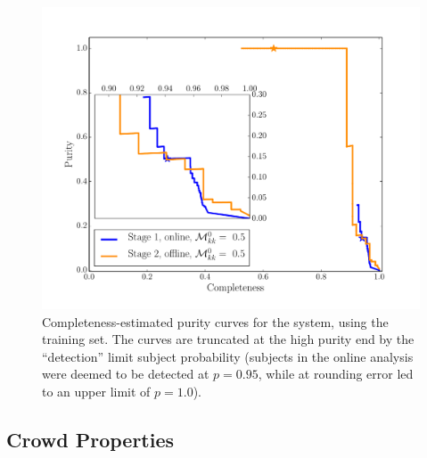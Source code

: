 \documentclass[useAMS,usenatbib,a4paper]{mn2e}
\begin{document}
\begin{figure}
\centering\includegraphics[width=\linewidth]{completeness_purity_simple.pdf}
\caption{Completeness-estimated purity curves for the \sw system, using
the \cfhtls training set. The curves are truncated at the high purity end by
the ``detection'' limit subject probability (subjects in the online
\StageOne analysis were
deemed to be detected at $p=0.95$, while at \StageTwo rounding error led to
an upper limit of $p=1.0$).}
\label{fig:results:sample:CP}
\end{figure}


\subsection{Crowd Properties}
\label{sec:results:crowd}
\end{document}
